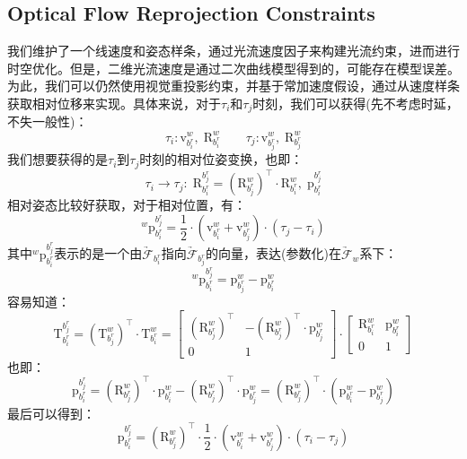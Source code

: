 \documentclass[12pt, onecolumn]{article}
\newcommand\bsm[1]{\boldsymbol{\mathrm{#1}}}
\newcommand\transform[2]{{\bsm{T}_{#1}^{#2}}}
\newcommand\rotation[2]{{\bsm{R}_{#1}^{#2}}}
\newcommand\translation[2]{{\bsm{p}_{#1}^{#2}}}
\newcommand\linvel[2]{{\bsm{v}_{#1}^{#2}}}
\newcommand\coordframe[1]{\underrightarrow{\mathcal{F}}_{#1}}
\begin{document}
	\subsection{Optical Flow Reprojection Constraints}
	我们维护了一个线速度和姿态样条，通过光流速度因子来构建光流约束，进而进行时空优化。但是，二维光流速度是通过二次曲线模型得到的，可能存在模型误差。为此，我们可以仍然使用视觉重投影约束，并基于常加速度假设，通过从速度样条获取相对位移来实现。具体来说，对于$\tau_{i}$和$\tau_{j}$时刻，我们可以获得(先不考虑时延，不失一般性)：
	\begin{equation}
	\tau_{i}:\linvel{b^r_i}{w},\;\rotation{b^r_i}{w}
	\qquad
	\tau_{j}:\linvel{b^r_j}{w},\;\rotation{b^r_j}{w}
	\end{equation}
	我们想要获得的是$\tau_i$到$\tau_j$时刻的相对位姿变换，也即：
	\begin{equation}
	\tau_{i}\to\tau_{j}:\;\rotation{b^r_i}{b^r_j}=\left( \rotation{b^r_j}{w}\right)^\top\cdot\rotation{b^r_i}{w},\;\translation{b^r_i}{b^r_j}
	\end{equation}
	相对姿态比较好获取，对于相对位置，有：
	\begin{equation}
	^{w}\translation{b^r_i}{b^r_j}=\frac{1}{2}\cdot\left(\linvel{b^r_i}{w}+\linvel{b^r_j}{w} \right) \cdot\left( \tau_j-\tau_i\right) 
	\end{equation}
	其中$^{w}\translation{b^r_i}{b^r_j}$表示的是一个由$\coordframe{b^r_i}$指向$\coordframe{b^r_j}$的向量，表达(参数化)在$\coordframe{w}$系下：
	\begin{equation}
	^{w}\translation{b^r_i}{b^r_j}=\translation{b^r_j}{w}-\translation{b^r_i}{w}
	\end{equation}
	容易知道：
	\begin{equation}
	\transform{b^r_i}{b^r_j}=\left( \transform{b^r_j}{w}\right)^\top\cdot\transform{b^r_i}{w}
	=\begin{bmatrix}
	\left( \rotation{b^r_j}{w}\right)^\top&-\left( \rotation{b^r_j}{w}\right)^\top\cdot\translation{b^r_j}{w}\\
	\bsm{0}&1
	\end{bmatrix}\cdot
	\begin{bmatrix}
	\rotation{b^r_i}{w}&\translation{b^r_i}{w}\\
	\bsm{0}&1
	\end{bmatrix}
	\end{equation}
	也即：
	\begin{equation}
	\translation{b^r_i}{b^r_j}=\left( \rotation{b^r_j}{w}\right)^\top\cdot\translation{b^r_i}{w}-\left( \rotation{b^r_j}{w}\right)^\top\cdot\translation{b^r_j}{w}
	=\left( \rotation{b^r_j}{w}\right)^\top\cdot\left( \translation{b^r_i}{w}-\translation{b^r_j}{w}\right) 
	\end{equation}
	最后可以得到：
	\begin{equation}
	\translation{b^r_i}{b^r_j}=\left( \rotation{b^r_j}{w}\right)^\top\cdot\frac{1}{2}\cdot\left(\linvel{b^r_i}{w}+\linvel{b^r_j}{w} \right) \cdot\left( \tau_i-\tau_j\right) 
	\end{equation}
	
\end{document}
